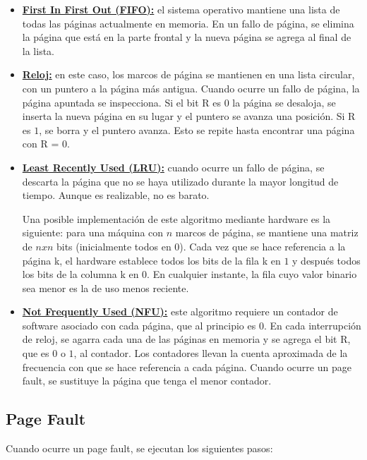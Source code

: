 \begin{itemize}
\item \textbf{\underline{First In First Out (FIFO):}} el sistema operativo mantiene una lista de todas las páginas actualmente en memoria. En un fallo de página, se elimina la página que está en la parte frontal y la nueva página se agrega al final de la lista.

\item \textbf{\underline{Reloj:}} en este caso, los marcos de página se mantienen en una lista circular, con un puntero a la página más antigua. Cuando ocurre un fallo de página, la página apuntada se inspecciona. Si el bit R es $0$ la página se desaloja, se inserta la nueva página en su lugar y el puntero se avanza una posición. Si R es $1$, se borra y el puntero avanza. Esto se repite hasta encontrar una página con R = $0$.

\item \textbf{\underline{Least Recently Used (LRU):}} cuando ocurre un fallo de página, se descarta la página que no se haya utilizado durante la mayor longitud de tiempo. Aunque es realizable, no es barato.

Una posible implementación de este algoritmo mediante hardware es la siguiente: para una máquina con $n$ marcos de página, se mantiene una matriz de $nxn$ bits (inicialmente todos en $0$). Cada vez que se hace referencia a la página k, el hardware establece todos los bits de la fila k en $1$ y después todos los bits de la columna k en $0$. En cualquier instante, la fila cuyo valor binario sea menor es la de uso menos reciente.

\item \textbf{\underline{Not Frequently Used (NFU):}} este algoritmo requiere un contador de software asociado con cada página, que al principio es $0$. En cada interrupción de reloj, se agarra cada una de las páginas en memoria y se agrega el bit R, que es $0$ o $1$, al contador. Los contadores llevan la cuenta aproximada de la frecuencia con que se hace referencia a cada página. Cuando ocurre un page fault, se sustituye la página que tenga el menor contador.
\end{itemize}


\subsection{Page Fault}

Cuando ocurre un page fault, se ejecutan los siguientes pasos:

